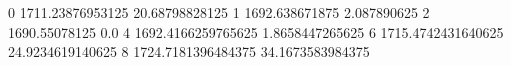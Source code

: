 0 1711.23876953125 20.68798828125
1 1692.638671875 2.087890625
2 1690.55078125 0.0
4 1692.4166259765625 1.8658447265625
6 1715.4742431640625 24.9234619140625
8 1724.7181396484375 34.1673583984375
